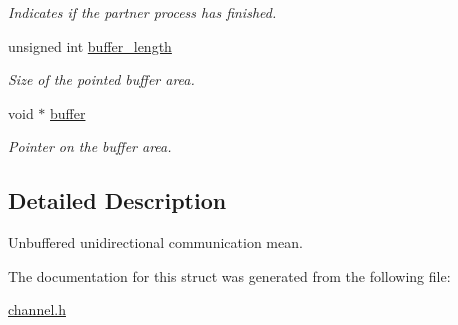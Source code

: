 \begin{DoxyCompactItemize}
\begin{DoxyCompactList}\small\item\em Indicates if the partner process has finished. \end{DoxyCompactList}\item 
\hypertarget{structchannel__t_a74cdeb703c27a61b90a0dc435cddec29}{unsigned int \hyperlink{structchannel__t_a74cdeb703c27a61b90a0dc435cddec29}{buffer\-\_\-length}}\label{structchannel__t_a74cdeb703c27a61b90a0dc435cddec29}

\begin{DoxyCompactList}\small\item\em Size of the pointed buffer area. \end{DoxyCompactList}\item 
\hypertarget{structchannel__t_a2aa54fcb1c2ef0675bb3b9b1b775b39e}{void $\ast$ \hyperlink{structchannel__t_a2aa54fcb1c2ef0675bb3b9b1b775b39e}{buffer}}\label{structchannel__t_a2aa54fcb1c2ef0675bb3b9b1b775b39e}

\begin{DoxyCompactList}\small\item\em Pointer on the buffer area. \end{DoxyCompactList}\end{DoxyCompactItemize}


\subsection{Detailed Description}
Unbuffered unidirectional communication mean. 

The documentation for this struct was generated from the following file\-:\begin{DoxyCompactItemize}
\item 
\hyperlink{channel_8h}{channel.\-h}\end{DoxyCompactItemize}
